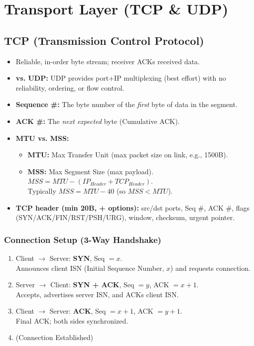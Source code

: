 \section{Transport Layer (TCP \& UDP)}

\subsection{TCP (Transmission Control Protocol)}
\begin{itemize}
    \item Reliable, in-order byte stream; receiver ACKs received data.
    \item \textbf{vs. UDP:} UDP provides port+IP multiplexing (best effort) with no reliability, ordering, or flow control.
    \item \textbf{Sequence \#:} The byte number of the \textit{first} byte of data in the segment.
    \item \textbf{ACK \#:} The \textit{next expected} byte (Cumulative ACK).
    \item \textbf{MTU vs. MSS:}
    \begin{itemize}
        \item \textbf{MTU:} Max Transfer Unit (max packet size on link, e.g., 1500B).
        \item \textbf{MSS:} Max Segment Size (max payload). $MSS = MTU - (IP_{Header} + TCP_{Header})$. \\ Typically $MSS = MTU - 40$ (so $MSS < MTU$).
    \end{itemize}
	\item \textbf{TCP header (min 20B, + options):} src/dst ports, Seq \#, ACK \#, flags (SYN/ACK/FIN/RST/PSH/URG), window, checksum, urgent pointer.
\end{itemize}

\subsubsection{Connection Setup (3-Way Handshake)}
\begin{enumerate}
	\item Client $\to$ Server: \textbf{SYN}, Seq $= x$.\\
	\quad Announces client ISN (Initial Sequence Number, $x$) and requests connection.
	\item Server $\to$ Client: \textbf{SYN + ACK}, Seq $= y$, ACK $= x+1$.\\
	\quad Accepts, advertises server ISN, and ACKs client ISN.
	\item Client $\to$ Server: \textbf{ACK}, Seq $= x+1$, ACK $= y+1$.\\
	\quad Final ACK; both sides synchronized.
    \item (Connection Established)
\end{enumerate}

